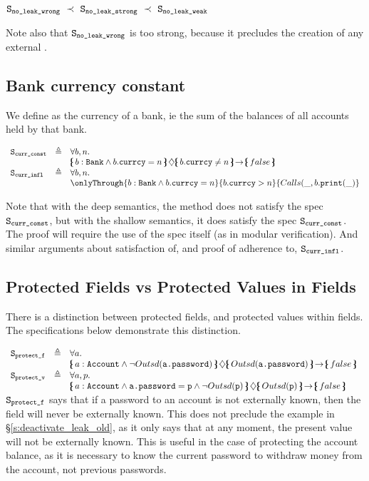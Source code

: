 $\Spec{no\_leak\_wrong}  \ \prec\ \Spec{no\_leak\_strong}  \ \prec \ \Spec{no\_leak\_weak} $

\noindent
Note also that
 ${\texttt{S}}_{{\texttt{no\_leak\_wrong}}} $ is too strong, because it precludes the creation of any external  .
 
 \subsection{Bank currency constant}
 
 We define as  the currency of a bank, ie the sum of the balances of all accounts held by that bank.
 
 $\begin{array}{lll}
 \Spec{curr\_const} & \triangleq &  \forall b,n.\\
 & &   \onlyIf{b:\prg{Bank}\wedge b.\prg{currcy}=n}{b.\prg{currcy}\neq n} {false}\   
 \\
  \Spec{curr\_infl} & \triangleq &  \forall b,n.\\
 & &   \onlyThrough{b:\prg{Bank}\wedge b.\prg{currcy}=n}{b.\prg{currcy}> n} {\calls{\_}{b}{\prg{print}}{\_} }   
\end{array}
$
 
 Note that with the deep semantics, the method   does not satisfy the spec $ {\texttt{S}}_{{\texttt{curr\_const}}}$, but with the shallow semantics, it does satisfy the spec $ {\texttt{S}}_{{\texttt{curr\_const}}}$. The proof will require the use of the spec itself (as in modular verification). And similar arguments about satisfaction of,  and proof of  adherence to, ${\texttt{S}}_{{\texttt{curr\_infl}}}$.
 
\subsection{Protected Fields vs Protected Values in Fields}

There is a distinction between protected fields, and protected values within fields. 
The specifications below demonstrate this distinction.
 
 $\begin{array}{lll}
 \Spec{protect\_f} & \triangleq &  \forall a.\\
 & &   \onlyIf{a:\prg{Account}\wedge \neg \outside{\prg{a.password}}}
 					{\outside{\prg{a.password}}} 
 					{false}\   
 \\
 \Spec{protect\_v} & \triangleq &  \forall a, p.\\
 & &   \onlyIf{a:\prg{Account}\wedge \prg{a.password} = \prg{p} \wedge \neg \outside{\prg{p}}}
 					{\outside{\prg{p}}} 
 					{false}\    
\end{array}
$
${\texttt{S}}_{{\texttt{protect\_f}}}$ says that if a password to an account is not externally known, then 
the field will never be externally known. This does not preclude the example in \S \ref{s:deactivate_leak_old}, as it only says that at any moment, the present value will not be externally known. This is useful in the case of protecting the account balance, as it is necessary to know the current password to withdraw money from the account, not previous passwords.

